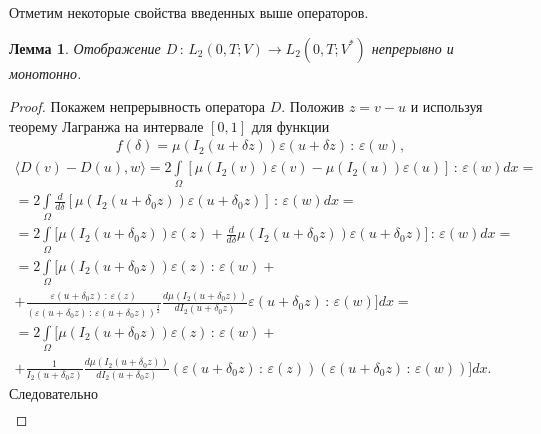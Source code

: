 \documentclass[14pt, a4paper]{extarticle}
\newtheorem{lemma}{Лемма}[section]
\numberwithin{equation}{section}
\begin{document}
    Отметим некоторые свойства введенных выше операторов.
    \begin{lemma}
        Отображение $D\, : \,L_2(0,T;V) \rightarrow L_2(0,T;V^*)$ непрерывно и монотонно.
    \end{lemma}
    \begin{proof}
        Покажем непрерывность оператора $D$. Положив $z = v - u$ и используя теорему Лагранжа
        на интервале $[0, 1]$ для функции
        \begin{equation*}
            \begin{gathered}
                f(\delta) = \mu (I_2(u + \delta z)) \varepsilon(u + \delta z)\, : \,\varepsilon(w),
            \end{gathered}
        \end{equation*}
        \begin{equation*}
            \begin{gathered}
                \langle D(v) - D(u), w \rangle = 2\int\limits_\Omega [\mu(I_2(v))\varepsilon(v) - \mu(I_2(u))\varepsilon(u)]\, : \,\varepsilon(w)dx =\\
                = 2\int\limits_\Omega \frac{d}{d\delta} [\mu(I_2(u+\delta_0 z))\varepsilon(u+\delta_0 z)]\, : \,\varepsilon(w)dx =\\
                = 2\int\limits_\Omega \bigg[ \mu(I_2(u+\delta_0 z))\varepsilon(z) + \frac{d}{d\delta} \mu(I_2(u+\delta_0 z))\varepsilon(u+\delta_0 z) \bigg]\, : \,\varepsilon(w)dx =\\
                = 2\int\limits_\Omega \bigg[ \mu(I_2(u+\delta_0 z))\varepsilon(z)\, : \,\varepsilon(w) + \\
                + \frac{\varepsilon(u+\delta_0 z)\, : \,\varepsilon(z)}{(\varepsilon(u+\delta_0 z)\, : \,\varepsilon(u+\delta_0 z))^{\frac{1}{2}}}
                \frac{d\mu(I_2(u+\delta_0 z))}{dI_2(u+\delta_0 z)} \varepsilon(u+\delta_0 z)\, : \,\varepsilon(w) \bigg] dx =\\
                = 2\int\limits_\Omega \bigg[ \mu(I_2(u+\delta_0 z))\varepsilon(z)\, : \,\varepsilon(w) + \\
                + \frac{1}{I_2(u+\delta_0 z)} \frac{d\mu(I_2(u+\delta_0 z))}{dI_2(u+\delta_0 z)} (\varepsilon(u+\delta_0 z)\, : \,\varepsilon(z))(\varepsilon(u+\delta_0 z)\, : \,\varepsilon(w)) \bigg] dx.
            \end{gathered}
        \end{equation*}
        \noindent Следовательно
        \begin{equation*}
            \begin{gathered}

\end{gathered}
\end{equation*}
\end{proof}
\end{document}
